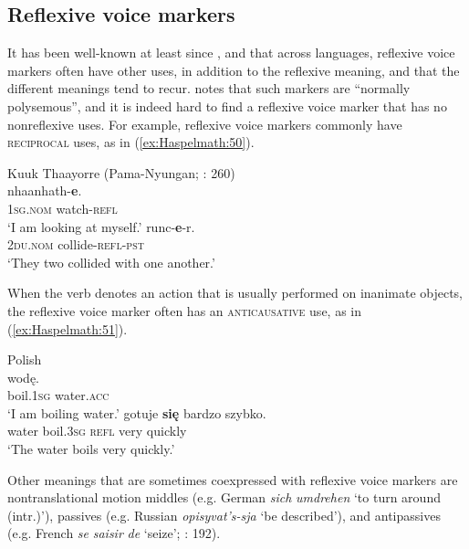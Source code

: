 \documentclass[output=paper]{langscibook}
\begin{document}
\subsection{Reflexive voice markers}\label{sec:Haspelmath:11.1}
It has been well-known at least since \citet{Faltz1977},  \citet[ch1]{Geniusiene1987} and \citet{Kemmer1993} that across languages, reflexive voice markers often have other uses, in addition to the reflexive meaning, and that the different meanings tend to recur. \citet[917]{Kazenin2001} notes that such markers are “normally polysemous”, and it is indeed hard to find a reflexive voice marker that has no nonreflexive uses. For example, reflexive voice markers commonly have \textsc{reciprocal} uses, as in (\ref{ex:Haspelmath:50}).

\ea%
   Kuuk Thaayorre (Pama-Nyungan; \citealt{Gaby2008}: 260) \label{ex:Haspelmath:50}\\
    \ea  
      {nhaanhath-}\textbf{{e}}.\\
        \textsc{1sg.nom}  watch-\textsc{refl}\\
    \glt  ‘I am looking at myself.’
    \ex 
      {runc-}\textbf{{e}}{{}-r.}\\
      \textsc{2du.nom}  collide-\textsc{refl-pst}\\
      \glt ‘They two collided with one another.’
    \z
\z 

When the verb denotes an action that is usually performed on inanimate objects, the reflexive voice marker often has an \textsc{anticausative} use, as in (\ref{ex:Haspelmath:51}).

\ea%
  Polish \citep{Janic2020}  \label{ex:Haspelmath:51}\\
    \ea 
      {wodę.}\\
      boil.\textsc{1sg}  water.\textsc{acc}   \\
    \glt  ‘I am boiling water.’
    \ex 
      {gotuje}  \textbf{{się}}  {bardzo}  {szybko.}\\
      water  boil.\textsc{3sg}  \textsc{refl}  very  quickly  \\
    \glt ‘The water boils very quickly.’
    \z
\z 
         
Other meanings that are sometimes coexpressed with reflexive voice markers are nontranslational motion middles (e.g. German \textit{sich} \textit{umdrehen} ‘to turn around (intr.)’), passives (e.g. Russian \textit{opisyvat’s-sja} ‘be described’), and antipassives (e.g. French \textit{se} \textit{saisir} \textit{de} ‘seize’; \citealt{Janic2016}: 192).
\end{document}
